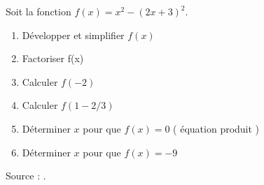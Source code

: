 
\begin{exercice}\label{exoSeconde-0052}

    Soit la fonction \( f(x)=x^2-(2x+3)^2\).
    \begin{enumerate}
        \item
 Développer et simplifier $f(x)$
 \item
 Factoriser f(x)
\item
 Calculer $f(-2)$ 
 \item
 Calculer $f(1-2/3)$
 \item
 Déterminer $x$ pour que $f(x)=0$ ( équation produit ) 
 \item
 Déterminer $x$ pour que $f(x)=-9$
            
    \end{enumerate}
Source : \cite{mVKzlq}.

\end{exercice}
